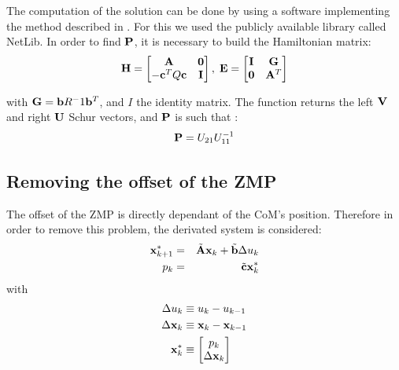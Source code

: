 The computation of the solution can be done by using a software implementing the
method described in \cite{Arnold1984}. For this we used the publicly available
library called NetLib. In order to find ${\bf P}$, it is necessary to build
the Hamiltonian matrix:
\begin{equation}
{\bf H} =
\left[
\begin{matrix}
{\bf A} & {\bf 0 } \\
-{\bf c}^TQ{\bf c} & {\bf I} \\
\end{matrix}
\right],
\;
{\bf E} =
\left[
\begin{matrix}
{\bf I} & {\bf G } \\
{\bf 0} & {\bf A}^T \\
\end{matrix}
\right]
\end{equation}

with ${\bf G}= {\bf b} R^-1 {\bf b}^T$, and $I$ the identity matrix.
The function returns the left ${\bf V}$ and right ${\bf U}$ Schur vectors,
and ${\bf P}$ is such that :
\begin{equation}
{\bf P} = U_{21}U_{11}^{-1}
\end{equation}

\subsection{Removing the offset of the ZMP}

The offset of the ZMP is directly dependant of the CoM's position.
Therefore in order to remove this problem, the derivated system is considered:
\begin{equation}
\begin{aligned}
     {\bf x}^*_{k+1} & =& \tilde{\bf A} {\bf x}_k + \tilde{{\bf b}} \Delta u_k \\
     p_k &=& \tilde{\bf c}{\bf x}^*_k\\
\end{aligned}
\end{equation}
with
\begin{equation}
\begin{aligned}
\Delta u_k & \equiv u_k - u_{k-1} \\
\Delta{\bf x}_k & \equiv {\bf x}_k - {\bf x}_{k-1}\\
 {\bf x}^*_k & \equiv
	\left[
	\begin{matrix}
	p_k \\
	\Delta {\bf x}_k \\
	\end{matrix}
	\right] \\
\end{aligned}
\end{equation}



